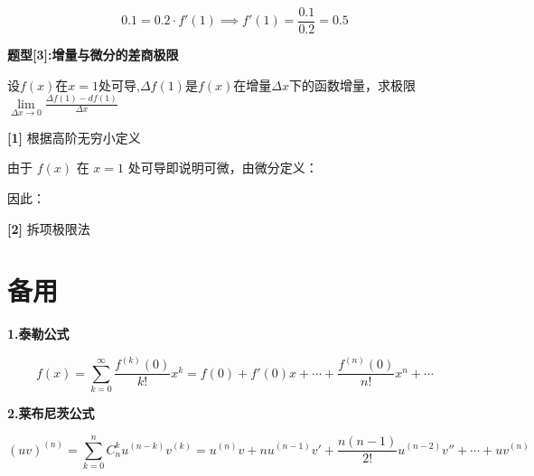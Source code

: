 \documentclass[11pt,a4paper,UTF8]{ctexart}
\begin{document}
\begin{thmbox}
  
\begin{equation*}
0.1 = 0.2 \cdot f'(1) \implies f'(1) = \frac{0.1}{0.2} = 0.5
\end{equation*}


\textbf{题型[3]:增量与微分的差商极限}

设$f(x)$在$x = 1$处可导,$\Delta f(1)$是$f(x)$在增量$\Delta x$下的函数增量，求极限$\lim\limits_{\Delta x \to 0} \frac{\Delta f(1) - df(1)}{\Delta x}$

\textbf{[1]} 根据高阶无穷小定义

由于 $f(x)$ 在 $x=1$ 处可导即说明可微，由微分定义：


因此：


\textbf{[2]} 拆项极限法


\end{thmbox}

\section{备用}

\textbf{1.泰勒公式}


\begin{equation*}
f(x) = \sum_{k=0}^{\infty} \frac{f^{(k)}(0)}{k!} x^k = f(0) + f'(0)x + \cdots + \frac{f^{(n)}(0)}{n!} x^n + \cdots
\end{equation*}

\textbf{2.莱布尼茨公式}


\begin{equation*}
(uv)^{(n)} = \sum_{k=0}^{n} C_n^k u^{(n-k)} v^{(k)} = u^{(n)}v + n u^{(n-1)}v' + \frac{n(n-1)}{2!} u^{(n-2)}v'' + \cdots + u v^{(n)}
\end{equation*}
\end{document}
